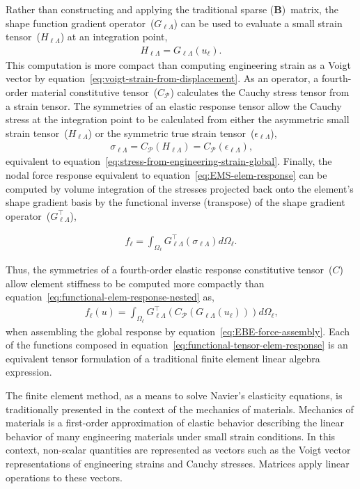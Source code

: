 \documentclass[]             %
{NASA}                       %
\begin{document}
Rather than constructing and applying the traditional sparse ($\mathbf{B}$)~matrix, the shape function gradient operator~($G_{\ell\Lambda}$)
 can be used to evaluate a small strain tensor~($H_{\ell\Lambda}$) at an integration point,
\begin{eqnarray}
H_{\ell\Lambda} = G_{\ell\Lambda}(u_{\ell})\text{.}\label{eq:small-strain-1}
\end{eqnarray}
This computation is more compact than computing engineering strain as a Voigt vector by
equation~\ref{eq:voigt-strain-from-displacement}.
 As an operator, a fourth-order material constitutive tensor~($C_{\mathcal{P}}$)
 calculates the Cauchy stress tensor from a strain tensor.
 The symmetries of an elastic response tensor allow the Cauchy stress at the 
 integration point to be calculated from either the asymmetric small strain tensor~($H_{\ell\Lambda}$)
 or the symmetric true strain tensor~($\epsilon_{\ell\Lambda}$),
\begin{eqnarray}
\sigma_{\ell\Lambda} = C_{\mathcal{P}}(H_{\ell\Lambda})=C_{\mathcal{P}}(\epsilon_{\ell\Lambda})\text{,}
\end{eqnarray}
equivalent to equation~\ref{eq:stress-from-engineering-strain-global}.
 Finally, the nodal force response equivalent to equation~\ref{eq:EMS-elem-response}
can be computed by volume integration of the stresses projected back onto
 the element's shape gradient basis by the functional inverse (transpose) of the shape gradient
 operator~($G_{\ell\Lambda}^{\top}$),

\begin{eqnarray}
f_{\ell} = \int_{\Omega_{\ell}}G_{\ell\Lambda}^{\top}(\sigma_{\ell\Lambda})d\Omega_{\ell}\text{.}
\end{eqnarray}

Thus, the symmetries of a fourth-order elastic response constitutive tensor~($C$)
 allow element stiffness to be computed more compactly than 
 equation~\ref{eq:functional-elem-response-nested} as,
\begin{eqnarray}
f_{\ell}(u) = \int_{\Omega_{\ell}}G_{\ell\Lambda}^{\top}(C_{\mathcal{P}}(G_{\ell\Lambda}(u_{\ell})))d\Omega_{\ell}\text{,}\label{eq:functional-tensor-elem-response}
\end{eqnarray}
when assembling the global response by equation~\ref{eq:EBE-force-assembly}.
 Each of the functions composed in equation~\ref{eq:functional-tensor-elem-response}
 is an equivalent tensor formulation of a traditional finite element linear
 algebra expression.

The finite element method, as a means to solve Navier's elasticity equations,
 is traditionally presented in the context of the mechanics of materials.
 Mechanics of materials is a first-order approximation of elastic behavior
 describing the linear behavior of many engineering materials under
 small strain conditions.
 In this context, non-scalar quantities are represented as vectors such
 as the Voigt vector representations of engineering strains and Cauchy stresses.
 Matrices apply linear operations to these vectors.
\end{document}
